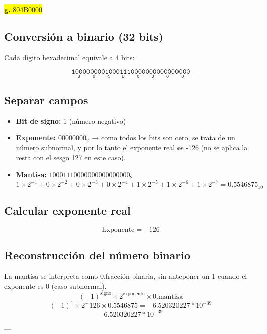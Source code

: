 \documentclass[a4paper,12pt]{article}
\begin{document}
	\begin{center}
		\colorbox{yellow}{\textbf{g.} 804B0000}
		\subsection*{Conversión a binario (32 bits)}
		Cada dígito hexadecimal equivale a 4 bits:
		
		\[
		\mathtt{
			\underset{\text{8}}{\boxed{\mathtt{1000}}}
			\underset{\text{0}}{\boxed{\mathtt{0000}}}
			\underset{\text{4}}{\boxed{\mathtt{0100}}}
			\underset{\text{B}}{\boxed{\mathtt{0111}}}
			\underset{\text{0}}{\boxed{\mathtt{0000}}}
			\underset{\text{0}}{\boxed{\mathtt{0000}}}
			\underset{\text{0}}{\boxed{\mathtt{0000}}}
			\underset{\text{0}}{\boxed{\mathtt{0000}}}
		}	
		\]
		
		\subsection*{Separar campos}
		
		\begin{itemize}
			\item \textbf{Bit de signo:} 1 (número negativo)
			\item \textbf{Exponente:} $00000000_2$ → como todos los bits son cero, se trata de un número subnormal, y por lo tanto el exponente real es -126 (no se aplica la resta con el sesgo 127 en este caso).
			\item \textbf{Mantisa:} $10001110000000000000000_2$ 
			\[
			1\times2^{-1} + 0\times2^{-2} + 0\times2^{-3} + 0\times2^{-4} + 1\times2^{-5} + 1\times2^{-6} + 1\times2^{-7} = 0.5546875_{10}
			\]
		\end{itemize}
		
		\subsection*{Calcular exponente real}
		
		\[
		\text{Exponente} = -126
		\]
		
		
		
		\subsection*{Reconstrucción del número binario}
		La mantisa se interpreta como 0.fracción binaria, sin anteponer un 1 cuando el exponente es 0 (caso subnormal).	
		\[
		(-1)^{\text{signo}} \times 2^{\text{exponente}} \times 0.\text{mantisa}
		\]
		\[
		(-1)^1 \times 2^-126 \times 0.5546875 = -6.520320227*10^{-39}
		\]
		\vspace{1em}
		\[
		\boxed{-6.520320227*10^{-39}}
		\]
		
		---
	\end{center}
\end{document}
